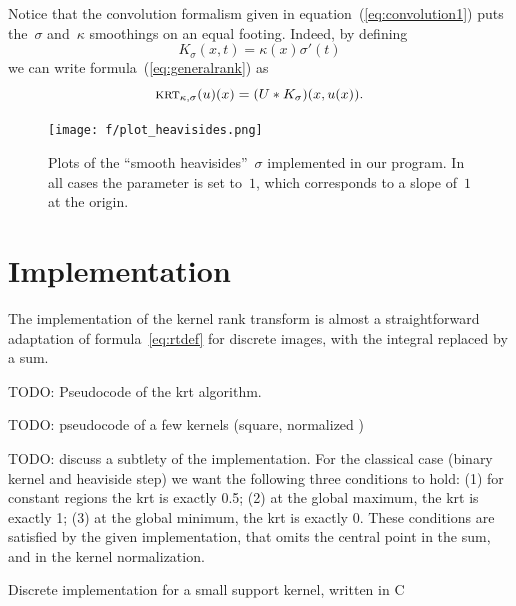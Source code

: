 \documentclass[12pt]{article}                  %
\begin{document}
Notice that the convolution formalism given in
equation~(\ref{eq:convolution1}) puts the~$\sigma$ and~$\kappa$ smoothings
on an equal footing.  Indeed, by defining
\[
	K_\sigma(x,t)=\kappa(x)\sigma'(t)
\]
we can write formula~(\ref{eq:generalrank}) as
\begin{equation}\label{eq:convolution2}
	\textsc{krt}_{\kappa,\sigma}(u)(x)=(U*K_\sigma)(x,u(x)).
\end{equation}


\begin{figure}
	\centering
	\texttt{[image: f/plot\_heavisides.png]}
	\caption{Plots of the ``smooth heavisides''~$\sigma$ implemented in
	our program.  In all cases the parameter is set to~$1$, which
	corresponds to a slope of~$1$ at the origin.}
	\label{fig:heavisides}
\end{figure}



\section{Implementation}

The implementation of the kernel rank transform is almost a straightforward
adaptation of formula~\ref{eq:rtdef} for discrete images, with the integral
replaced by a sum.

TODO: Pseudocode of the krt algorithm.

TODO: pseudocode of a few kernels (square, normalized )

TODO: discuss a subtlety of the implementation.  For the classical case
(binary kernel and heaviside step) we want the following three conditions to
hold: (1) for constant regions the krt is exactly 0.5;  (2) at the global
maximum, the krt is exactly 1; (3) at the global minimum, the krt is exactly
0.  These conditions are satisfied by the given implementation, that omits
the central point in the sum, and in the kernel normalization.

Discrete implementation for a small support kernel, written in C
\end{document}
